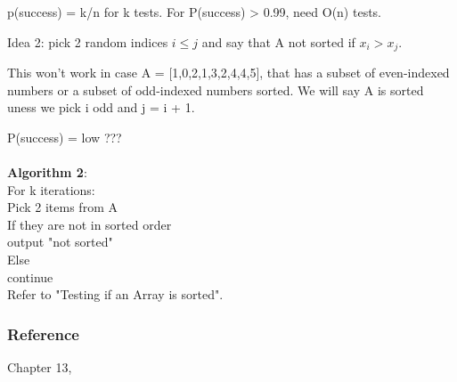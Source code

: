 \documentclass[12pt,article]{article}
\newcommand\tab[1][1cm]{\hspace*{#1}}
\begin{document}
p(success) = k/n for k tests. For P(success) > 0.99, need O(n) tests.

Idea 2: pick 2 random indices $i \leq j$ and say that A not sorted if $x_i > x_j$.

This won't work in case A = [1,0,2,1,3,2,4,4,5], that has a subset of even-indexed numbers or a subset of odd-indexed numbers sorted. We will say A is sorted uness we pick i odd and j = i + 1.

P(success) = low ???
\\
\\
\textbf{Algorithm 2}: \\
For k iterations: \\
\tab[1cm] Pick 2 items from A \\
\tab[1cm] If they are not in sorted order \\
\tab[1cm]   output "not sorted" \\
\tab[1cm] Else \\ 
\tab[1cm]   continue \\ 

Refer to "Testing if an Array is sorted".


\subsubsection{Reference}
Chapter 13, \cite{kleinbergalgorithm}

\newpage


\end{document}
